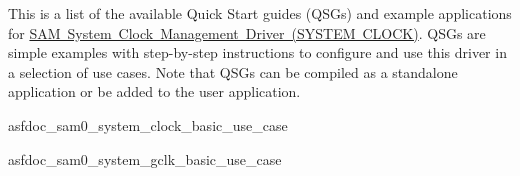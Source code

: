 This is a list of the available Quick Start guides (QSGs) and example applications for \mbox{\hyperlink{group__asfdoc__sam0__system__clock__group}{SAM System Clock Management Driver (SYSTEM CLOCK)}}. QSGs are simple examples with step-\/by-\/step instructions to configure and use this driver in a selection of use cases. Note that QSGs can be compiled as a standalone application or be added to the user application.


\begin{DoxyItemize}
\item asfdoc\+\_\+sam0\+\_\+system\+\_\+clock\+\_\+basic\+\_\+use\+\_\+case
\item asfdoc\+\_\+sam0\+\_\+system\+\_\+gclk\+\_\+basic\+\_\+use\+\_\+case 
\end{DoxyItemize}